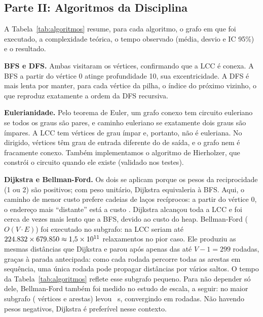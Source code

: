 \documentclass[sigconf]{webmedia}
\begin{document}
\subsection{Parte II: Algoritmos da Disciplina}

A Tabela~\ref{tab:algoritmos} resume, para cada algoritmo, o grafo em que foi executado,
a complexidade teórica, o tempo observado (média, desvio e IC 95\%) e o resultado.



\textbf{BFS e DFS.} Ambas visitaram os \nVLcc{} vértices, confirmando que a LCC é
conexa. A BFS a partir do vértice 0 atinge profundidade 10, sua excentricidade. A DFS é
mais lenta por manter, para cada vértice da pilha, o índice do próximo vizinho, o que
reproduz exatamente a ordem da DFS recursiva.

\textbf{Eulerianidade.} Pelo teorema de Euler, um grafo conexo tem circuito euleriano
se todos os graus são pares, e caminho euleriano se exatamente dois graus são ímpares.
A LCC tem \grauImpar{} vértices de grau ímpar e, portanto, não é euleriana. No dirigido,
\desbalanceados{} vértices têm grau de entrada diferente do de saída, e o grafo nem é fracamente
conexo. Também implementamos o algoritmo de Hierholzer, que constrói o circuito quando
ele existe (validado nos testes).

\textbf{Dijkstra e Bellman-Ford.} Os dois se aplicam porque os pesos da reciprocidade
(1 ou 2) são positivos; com peso unitário, Dijkstra equivaleria à BFS. Aqui, o caminho de
menor custo prefere cadeias de laços recíprocos: a partir do vértice 0, o endereço mais
``distante'' está a custo \distMaxDijkstra. Dijkstra alcançou toda a LCC e foi cerca de
\razaoDijkstraBfs{} vezes mais lento que a BFS, devido ao custo do heap. Bellman-Ford
($O(V\cdot E)$) foi executado no subgrafo: na LCC seriam até
$224.832 \times 679.850 \approx 1{,}5\times10^{11}$ relaxamentos no pior caso. Ele produziu
as mesmas distâncias que Dijkstra e parou após apenas \rodadasBf{} das até $V-1=299$ rodadas, graças à
parada antecipada: como cada rodada percorre todas as arestas em sequência, uma única
rodada pode propagar distâncias por vários saltos. O tempo da Tabela~\ref{tab:algoritmos}
reflete esse subgrafo pequeno. Para não depender só dele, Bellman-Ford também foi medido
no estudo de escala, a seguir: no maior subgrafo (\vBfEscala{} vértices e \eBfEscala{}
arestas) levou \tBfEscala~s, convergindo em \rodadasEscala{} rodadas.
Não havendo pesos negativos, Dijkstra é preferível nesse contexto.
\end{document}
